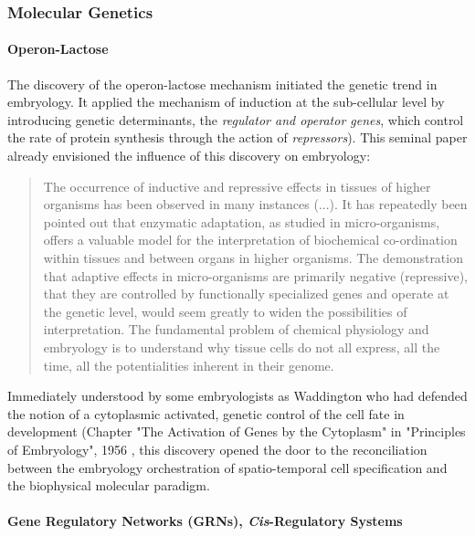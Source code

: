 \subsubsection{Molecular Genetics}


\paragraph{Operon-Lactose}


  The discovery of the operon-lactose mechanism initiated the genetic trend in embryology. It applied the mechanism of induction at the sub-cellular level by introducing genetic determinants, the \textit{regulator and operator genes}, which control the rate of protein synthesis through the action of \textit{repressors}\cite{JACOB:1961uh}). This seminal paper already envisioned the influence of this discovery on embryology: 
\begin{quotation}  The occurrence of inductive and repressive effects in tissues of higher organisms has been observed in many instances (...). It has repeatedly been pointed out that enzymatic adaptation, as studied in micro-organisms, offers a valuable model for the interpretation of biochemical co-ordination within tissues and between organs in higher organisms. The demonstration that adaptive effects in micro-organisms are primarily negative (repressive), that they are controlled by functionally specialized genes and operate at the genetic level, would seem greatly to widen the possibilities of interpretation. The fundamental problem of chemical physiology and embryology is to understand why tissue cells do not all express, all the time, all the potentialities inherent in their genome. 
\end{quotation}

  Immediately understood by some embryologists as Waddington who had defended the notion of a cytoplasmic activated, genetic control of the cell fate in development (Chapter "The Activation of Genes by the Cytoplasm" in "Principles of Embryology", 1956 \cite{Waddington:1956wf}, this discovery opened the door to the reconciliation between the embryology orchestration of spatio-temporal cell specification and the biophysical molecular paradigm. 

\paragraph{Gene Regulatory Networks (GRNs), \textit{Cis}-Regulatory Systems}


